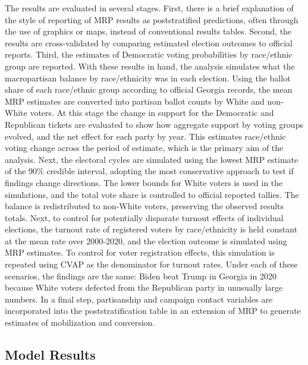 The results are evaluated in several stages. First, there is a brief explanation of the style of reporting of MRP results as poststratified predictions, often through the use of graphics or maps, instead of conventional results tables. Second, the results are cross-validated by comparing estimated election outcomes to official reports. Third, the estimates of Democratic voting probabilities by race/ethnic group are reported. With these results in hand, the analysis simulates what the macropartisan balance by race/ethnicity was in each election. Using the ballot share of each race/ethnic group according to official Georgia records, the mean MRP estimates are converted into partisan ballot counts by White and non-White voters. At this stage the change in support for the Democratic and Republican tickets are evaluated to show how aggregate support by voting groups evolved, and the net effect for each party by year. This estimates race/ethnic voting change across the period of estimate, which is the primary aim of the analysis. Next, the electoral cycles are simulated using the lowest MRP estimate of the 90\% credible interval, adopting the most conservative approach to test if findings change directions. The lower bounds for White voters is used in the simulations, and the total vote share is controlled to official reported tallies. The balance is redistributed to non-White voters, preserving the observed results totals. Next, to control for potentially disparate turnout effects of individual elections, the turnout rate of registered voters by race/ethnicity is held constant at the mean rate over 2000-2020, and the election outcome is simulated using MRP estimates. To control for voter registration effects, this simulation is repeated using CVAP as the denominator for turnout rates. Under each of these scenarios, the findings are the same: Biden beat Trump in Georgia in 2020 because White voters defected from the Republican party in unusually large numbers. In a final step, partisanship and campaign contact variables are incorporated into the poststratification table in an extension of MRP to generate estimates of mobilization and conversion.                 

\subsection{Model Results}

